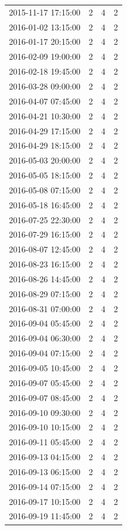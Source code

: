 \begin{tabular}{lrrr}
2015-11-17 17:15:00 & 2 & 4 & 2 \\
2016-01-02 13:15:00 & 2 & 4 & 2 \\
2016-01-17 20:15:00 & 2 & 4 & 2 \\
2016-02-09 19:00:00 & 2 & 4 & 2 \\
2016-02-18 19:45:00 & 2 & 4 & 2 \\
2016-03-28 09:00:00 & 2 & 4 & 2 \\
2016-04-07 07:45:00 & 2 & 4 & 2 \\
2016-04-21 10:30:00 & 2 & 4 & 2 \\
2016-04-29 17:15:00 & 2 & 4 & 2 \\
2016-04-29 18:15:00 & 2 & 4 & 2 \\
2016-05-03 20:00:00 & 2 & 4 & 2 \\
2016-05-05 18:15:00 & 2 & 4 & 2 \\
2016-05-08 07:15:00 & 2 & 4 & 2 \\
2016-05-18 16:45:00 & 2 & 4 & 2 \\
2016-07-25 22:30:00 & 2 & 4 & 2 \\
2016-07-29 16:15:00 & 2 & 4 & 2 \\
2016-08-07 12:45:00 & 2 & 4 & 2 \\
2016-08-23 16:15:00 & 2 & 4 & 2 \\
2016-08-26 14:45:00 & 2 & 4 & 2 \\
2016-08-29 07:15:00 & 2 & 4 & 2 \\
2016-08-31 07:00:00 & 2 & 4 & 2 \\
2016-09-04 05:45:00 & 2 & 4 & 2 \\
2016-09-04 06:30:00 & 2 & 4 & 2 \\
2016-09-04 07:15:00 & 2 & 4 & 2 \\
2016-09-05 10:45:00 & 2 & 4 & 2 \\
2016-09-07 05:45:00 & 2 & 4 & 2 \\
2016-09-07 08:45:00 & 2 & 4 & 2 \\
2016-09-10 09:30:00 & 2 & 4 & 2 \\
2016-09-10 10:15:00 & 2 & 4 & 2 \\
2016-09-11 05:45:00 & 2 & 4 & 2 \\
2016-09-13 04:15:00 & 2 & 4 & 2 \\
2016-09-13 06:15:00 & 2 & 4 & 2 \\
2016-09-14 07:15:00 & 2 & 4 & 2 \\
2016-09-17 10:15:00 & 2 & 4 & 2 \\
2016-09-19 11:45:00 & 2 & 4 & 2 \\

\end{tabular}
